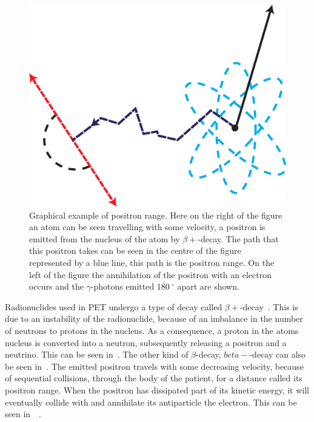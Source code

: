                 \begin{figure}
                    \centering
                    
                    \includegraphics[width=1.0\linewidth]{figures/background_positron_range.png}
                    
                    \captionsetup{singlelinecheck=false}
                    \caption{
                        Graphical example of positron range. Here on the right of the figure an atom can be seen travelling with some velocity, a positron is emitted from the nucleus of the atom by $\beta+$-decay. The path that this positron takes can be seen in the centre of the figure represented by a blue line, this path is the positron range. On the left of the figure the annihilation of the positron with an electron occurs and the $\gamma$-photons emitted $\SI{180}{^{\circ}}$ apart are shown.
                    }
                    \label{fig:decay_and_annihilation_positron_range}
                \end{figure}
                
                Radionuclides used in \gls{PET} undergo a type of decay called $\beta+$-decay~\parencite{conti_beta}. This is due to an instability of the radionuclide, because of an imbalance in the number of neutrons to protons in the nucleus. As a consequence, a proton in the atoms nucleus is converted into a neutron, subsequently releasing a positron and a neutrino. This can be seen in~. The other kind of $\beta$-decay, $beta-$-decay can also be seen in~. The emitted positron travels with some decreasing velocity, because of sequential collisions, through the body of the patient, for a distance called its positron range. When the positron has dissipated part of its kinetic energy, it will eventually collide with and annihilate its antiparticle the electron. This can be seen in~~\parencite{EvansPositronBib}. %
                
